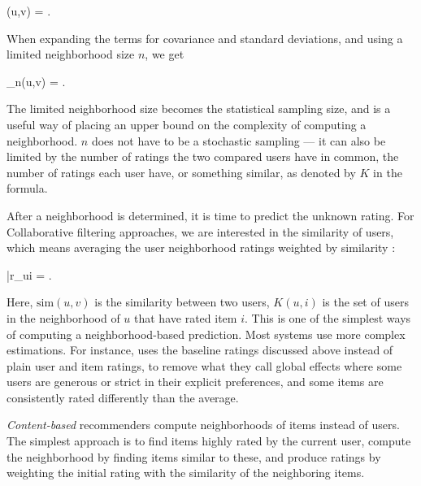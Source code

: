 \begin{eqsp}
  (u,v) = .
\end{eqsp}

When expanding the terms for covariance and standard deviations, 
and using a limited neighborhood size $n$, we get

\begin{eqsp}
  _{n}(u,v) = 
    .
\end{eqsp}

The limited neighborhood size becomes the statistical sampling size, and is a useful
way of placing an upper bound on the complexity of computing a neighborhood.
$n$ does not have to be a stochastic sampling --- it can also be limited by the number of ratings 
the two compared users have in common, the number of ratings each user have, or something similar,
as denoted by $K$ in the formula.

After a neighborhood is determined, it is time to predict the unknown rating.
For Collaborative filtering approaches, we are interested in the similarity of users,
which means averaging the user neighborhood ratings weighted by similarity \cite[p.16]{Segaran2007}:

\begin{eqsp}
  \bar{r}_{ui} = .
\end{eqsp}

Here, $\mathrm{sim}(u,v)$ is the similarity between two users, $K(u,i)$ is the set of users in the neighborhood of $u$ that have rated item $i$.
This is one of the simplest ways of computing a neighborhood-based prediction.
Most systems use more complex estimations. For instance, \cite{Koren2008} 
uses the baseline ratings discussed above instead of plain user and item ratings, to
remove what they call global effects where some users are generous or strict in their 
explicit preferences, and some items are consistently rated differently than the average.

\emph{Content-based} recommenders compute neighborhoods of items instead of users.
The simplest approach is to find items highly rated by the current user, compute the neighborhood 
by finding items similar to these, and produce ratings by weighting the initial rating
with the similarity of the neighboring items.

